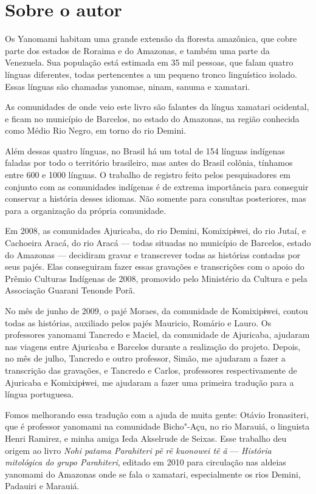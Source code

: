 
\section{Sobre o autor}

Os Yanomami habitam uma grande extensão da floresta amazônica, que cobre
parte dos estados de Roraima e do Amazonas, e também uma parte da
Venezuela. Sua população está estimada em 35 mil pessoas, que falam
quatro línguas diferentes, todas pertencentes a um pequeno tronco
linguístico isolado. Essas línguas são chamadas yanomae, ninam, sanuma e
xamatari.

As comunidades de onde veio este livro são falantes da língua xamatari
ocidental, e ficam no município de Barcelos, no estado do Amazonas, na
região conhecida como Médio Rio Negro, em torno do rio Demini. 
 
Além dessas quatro línguas, no Brasil há um
total de 154 línguas indígenas faladas por todo o território brasileiro,
mas antes do Brasil colônia, tínhamos entre 600 e 1000 línguas. O
trabalho de registro feito pelos pesquisadores em conjunto com as
comunidades indígenas é de extrema importância para conseguir conservar
a história desses idiomas. Não somente para consultas posteriores, mas
para a organização da própria comunidade.

Em 2008, as comunidades Ajuricaba, do rio Demini, Komixipɨwei, do rio
Jutaí, e Cachoeira Aracá, do rio Aracá --- todas situadas no município
de Barcelos, estado do Amazonas --- decidiram gravar e transcrever todas
as histórias contadas por seus pajés. Elas conseguiram fazer essas
gravações e transcrições com o apoio do Prêmio Culturas Indígenas de
2008, promovido pelo Ministério da Cultura e pela Associação Guarani
Tenonde Porã.

No mês de junho de 2009, o pajé Moraes, da comunidade de Komixipɨwei,
contou todas as histórias, auxiliado pelos pajés Mauricio, Romário e
Lauro. Os professores yanomami Tancredo e Maciel, da comunidade de
Ajuricaba, ajudaram nas viagens entre Ajuricaba e Barcelos durante a
realização do projeto. Depois, no mês de julho, Tancredo e outro
professor, Simão, me ajudaram a fazer a transcrição das gravações, e
Tancredo e Carlos, professores respectivamente de Ajuricaba e
Komixipɨwei, me ajudaram a fazer uma primeira tradução para a língua
portuguesa.  

Fomos melhorando essa tradução com a ajuda de muita gente: Otávio
Ironasiteri, que é professor yanomami na comunidade Bicho"-Açu, no rio
Marauiá, o linguista Henri Ramirez, e minha amiga Ieda Akselrude de
Seixas. Esse trabalho deu origem ao livro \emph{Nohi patama Parahiteri
pë rë kuonowei të ã} --- \emph{História mitológica do grupo Parahiteri},
editado em 2010 para circulação nas aldeias yanomami do Amazonas onde se
fala o xamatari, especialmente os rios Demini, Padauiri e Marauiá. 
 
